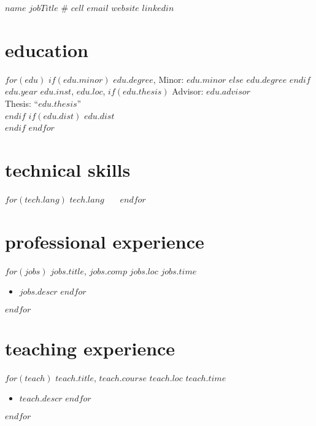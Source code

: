 \documentclass[]{friggeri-cv}
\begin{document}
\header
  {$name$}
  {$jobTitle$}
  {\# $cell$}
  {\href{mailto:$email$}{$email$}}
  {\href{$website$}{$website$}}
  {\href{$linkedin$}{$linkedin$}}



\vspace{-0.4in}
\section{education}
\begin{entrylist}
$for(edu)$
  \entrypub
  $if(edu.minor)$
    {$edu.degree$, Minor: $edu.minor$}
  $else$
    {$edu.degree$}
  $endif$
  {$edu.year$}
  {$edu.inst$, $edu.loc$, }
  $if(edu.thesis)$
    {Advisor: $edu.advisor$}\\
    {Thesis: ``$edu.thesis$''}\\
  $endif$
  $if(edu.dist)$
    {$edu.dist$}\\
  $endif$
$endfor$
\end{entrylist}



\vspace{-0.15in}
\section{technical skills}
\begin{changemargin}{0.35in}{0in}
$for(tech.lang)$
  \textbf{$tech.lang$} \, \, \,
$endfor$
\end{changemargin}



\vspace{-0.05in}
\section{professional experience}
\begin{entrylist}
$for(jobs)$
  \entryalt
  {\textit{$jobs.title$}, $jobs.comp$}
  {$jobs.loc$}
  {$jobs.time$}
  \setlength\parskip{0pt}
  \begin{itemize}[noitemsep, leftmargin=0.2in]
    $for(jobs.descr)$
      \item $jobs.descr$
    $endfor$
  \end{itemize}
  \setlength\parskip{12pt}
$endfor$
\end{entrylist}



\vspace{-0.05in}
\section{teaching experience}
\begin{entrylist}
$for(teach)$
  \entryalt
  {\textit{$teach.title$}, $teach.course$}
  {$teach.loc$}
  {$teach.time$}
  \setlength\parskip{0pt}
  \begin{itemize}[noitemsep, leftmargin=0.2in]
    $for(teach.descr)$
      \item $teach.descr$
    $endfor$
  \end{itemize}
  \setlength\parskip{12pt}
$endfor$
\end{entrylist}
\end{document}
